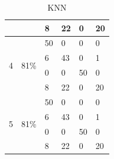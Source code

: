 \documentclass[USenglish]{ifimaster}  %
\begin{document}
\begin{table}[h]
\begin{tabular}{@{}llllll@{}}
		\multicolumn{1}{l|}{} & \multicolumn{1}{l|}{} & \multicolumn{1}{l|}{8} & \multicolumn{1}{l|}{22} & \multicolumn{1}{l|}{0} & 20 \\ \midrule
		\multicolumn{1}{l|}{\multirow{4}{*}{4}} & \multicolumn{1}{l|}{\multirow{4}{*}{81\%}} & \multicolumn{1}{l|}{50} & \multicolumn{1}{l|}{0} & \multicolumn{1}{l|}{0} & 0 \\ \cmidrule(l){3-6} 
		\multicolumn{1}{l|}{} & \multicolumn{1}{l|}{} & \multicolumn{1}{l|}{6} & \multicolumn{1}{l|}{43} & \multicolumn{1}{l|}{0} & 1 \\ \cmidrule(l){3-6} 
		\multicolumn{1}{l|}{} & \multicolumn{1}{l|}{} & \multicolumn{1}{l|}{0} & \multicolumn{1}{l|}{0} & \multicolumn{1}{l|}{50} & 0 \\ \cmidrule(l){3-6} 
		\multicolumn{1}{l|}{} & \multicolumn{1}{l|}{} & \multicolumn{1}{l|}{8} & \multicolumn{1}{l|}{22} & \multicolumn{1}{l|}{0} & 20 \\ \midrule
		\multicolumn{1}{l|}{\multirow{4}{*}{5}} & \multicolumn{1}{l|}{\multirow{4}{*}{81\%}} & \multicolumn{1}{l|}{50} & \multicolumn{1}{l|}{0} & \multicolumn{1}{l|}{0} & 0 \\ \cmidrule(l){3-6} 
		\multicolumn{1}{l|}{} & \multicolumn{1}{l|}{} & \multicolumn{1}{l|}{6} & \multicolumn{1}{l|}{43} & \multicolumn{1}{l|}{0} & 1 \\ \cmidrule(l){3-6} 
		\multicolumn{1}{l|}{} & \multicolumn{1}{l|}{} & \multicolumn{1}{l|}{0} & \multicolumn{1}{l|}{0} & \multicolumn{1}{l|}{50} & 0 \\ \cmidrule(l){3-6} 
		\multicolumn{1}{l|}{} & \multicolumn{1}{l|}{} & \multicolumn{1}{l|}{8} & \multicolumn{1}{l|}{22} & \multicolumn{1}{l|}{0} & 20 \\ \bottomrule
	\end{tabular}
	\caption{KNN }
	\label{knnexp}
\end{table}
\FloatBarrier
\end{document}
